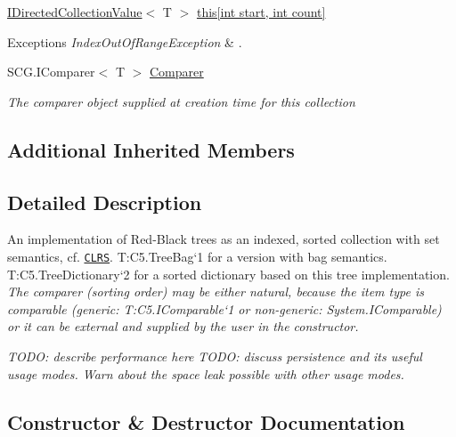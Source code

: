\begin{DoxyCompactItemize}
\item 
\hyperlink{interface_c5_1_1_i_directed_collection_value}{I\+Directed\+Collection\+Value}$<$ T $>$ \hyperlink{class_c5_1_1_tree_set_a8f145718895321cbd015c6c42de4e708}{this\mbox{[}int start, int count\mbox{]}}
\begin{DoxyCompactList}\small\item\em 
\begin{DoxyExceptions}{Exceptions}
{\em Index\+Out\+Of\+Range\+Exception} & . \\
\hline
\end{DoxyExceptions}
\end{DoxyCompactList}\item 
S\+C\+G.\+I\+Comparer$<$ T $>$ \hyperlink{class_c5_1_1_tree_set_aeb1bba55b148bb7263d26fd5f6ad8a16}{Comparer}
\begin{DoxyCompactList}\small\item\em The comparer object supplied at creation time for this collection \end{DoxyCompactList}\end{DoxyCompactItemize}
\subsection*{Additional Inherited Members}


\subsection{Detailed Description}
An implementation of Red-\/\+Black trees as an indexed, sorted collection with set semantics, cf. \href{litterature.htm#CLRS}{\tt C\+L\+R\+S}. T\+:\+C5.\+Tree\+Bag`1 for a version with bag semantics. T\+:\+C5.\+Tree\+Dictionary`2 for a sorted dictionary based on this tree implementation. {\itshape  The comparer (sorting order) may be either natural, because the item type is comparable (generic\+: T\+:\+C5.\+I\+Comparable`1 or non-\/generic\+: System.\+I\+Comparable) or it can be external and supplied by the user in the constructor.} 

{\itshape T\+O\+D\+O\+: describe performance here} {\itshape T\+O\+D\+O\+: discuss persistence and its useful usage modes. Warn about the space leak possible with other usage modes.} 

\subsection{Constructor \& Destructor Documentation}
\hypertarget{class_c5_1_1_tree_set_a035e624e1221baf19a1e3fa006992a60}{}
